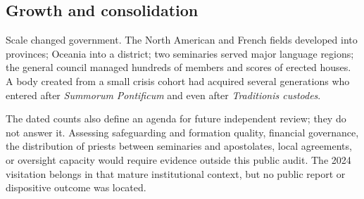 \subsection{Growth and consolidation}

Scale changed government. The North American and French fields developed into provinces; Oceania into a district; two seminaries served major language regions; the general council managed hundreds of members and scores of erected houses. A body created from a small crisis cohort had acquired several generations who entered after \emph{Summorum Pontificum} and even after \emph{Traditionis custodes}.

The dated counts also define an agenda for future independent review; they do not answer it. Assessing safeguarding and formation quality, financial governance, the distribution of priests between seminaries and apostolates, local agreements, or oversight capacity would require evidence outside this public audit. The 2024 visitation belongs in that mature institutional context, but no public report or dispositive outcome was located.

